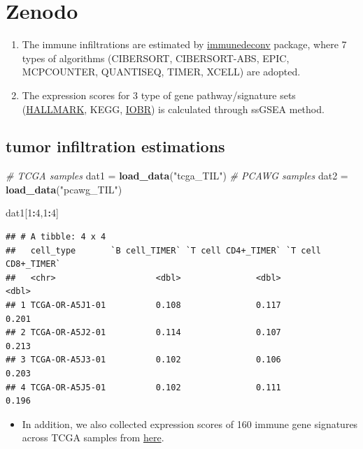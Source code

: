 \documentclass[
]{book}
\newenvironment{Shaded}{\begin{snugshade}}{\end{snugshade}}
\newcommand{\CommentTok}[1]{\textcolor[rgb]{0.56,0.35,0.01}{\textit{#1}}}
\newcommand{\DecValTok}[1]{\textcolor[rgb]{0.00,0.00,0.81}{#1}}
\newcommand{\FunctionTok}[1]{\textcolor[rgb]{0.13,0.29,0.53}{\textbf{#1}}}
\newcommand{\NormalTok}[1]{#1}
\newcommand{\OtherTok}[1]{\textcolor[rgb]{0.56,0.35,0.01}{#1}}
\newcommand{\SpecialCharTok}[1]{\textcolor[rgb]{0.81,0.36,0.00}{\textbf{#1}}}
\newcommand{\StringTok}[1]{\textcolor[rgb]{0.31,0.60,0.02}{#1}}
\providecommand{\tightlist}{%
  \setlength{\itemsep}{0pt}\setlength{\parskip}{0pt}}
\begin{document}
\section{Zenodo}\label{zenodo}

\begin{enumerate}
\def\labelenumi{(\arabic{enumi})}
\item
  The immune infiltrations are estimated by \href{https://github.com/omnideconv/immunedeconv}{immunedeconv} package, where 7 types of algorithms (CIBERSORT, CIBERSORT-ABS, EPIC, MCPCOUNTER, QUANTISEQ, TIMER, XCELL) are adopted.
\item
  The expression scores for 3 type of gene pathway/signature sets (\href{https://pubmed.ncbi.nlm.nih.gov/26771021/}{HALLMARK}, KEGG, \href{https://github.com/IOBR/IOBR}{IOBR}) is calculated through ssGSEA method.
\end{enumerate}

\subsection{tumor infiltration estimations}\label{tumor-infiltration-estimations}

\begin{Shaded}
\begin{Highlighting}[]
\CommentTok{\# TCGA samples}
\NormalTok{dat1 }\OtherTok{=} \FunctionTok{load\_data}\NormalTok{(}\StringTok{"tcga\_TIL"}\NormalTok{)}
\CommentTok{\# PCAWG samples}
\NormalTok{dat2 }\OtherTok{=} \FunctionTok{load\_data}\NormalTok{(}\StringTok{"pcawg\_TIL"}\NormalTok{)}

\NormalTok{dat1[}\DecValTok{1}\SpecialCharTok{:}\DecValTok{4}\NormalTok{,}\DecValTok{1}\SpecialCharTok{:}\DecValTok{4}\NormalTok{]}
\end{Highlighting}
\end{Shaded}

\begin{verbatim}
## # A tibble: 4 x 4
##   cell_type       `B cell_TIMER` `T cell CD4+_TIMER` `T cell CD8+_TIMER`
##   <chr>                    <dbl>               <dbl>               <dbl>
## 1 TCGA-OR-A5J1-01          0.108               0.117               0.201
## 2 TCGA-OR-A5J2-01          0.114               0.107               0.213
## 3 TCGA-OR-A5J3-01          0.102               0.106               0.203
## 4 TCGA-OR-A5J5-01          0.102               0.111               0.196
\end{verbatim}

\begin{itemize}
\tightlist
\item
  In addition, we also collected expression scores of 160 immune gene signatures across TCGA samples from \href{https://gdc.cancer.gov/about-data/publications/panimmune}{here}.
\end{itemize}
\end{document}

